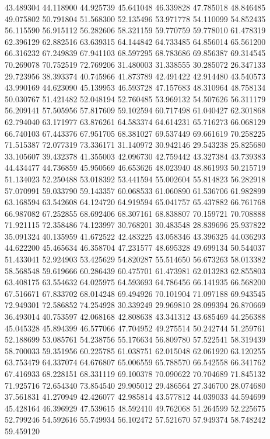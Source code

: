 43.489304
44.118900
44.925739
45.641048
46.339828
47.785018
48.846485
49.075802
50.791804
51.568300
52.135496
53.971778
54.110099
54.852435
56.115590
56.915112
56.282606
58.321159
59.770759
59.778010
61.478319
62.396129
62.882516
63.639315
64.144842
64.733485
64.856014
65.561200
66.316232
67.249839
67.941103
68.597295
68.783686
69.856387
69.314545
70.269078
70.752519
72.769206
31.480003
31.338555
30.285072
26.347133
29.723956
38.393374
40.745966
41.873789
42.491422
42.914480
43.540573
43.990169
44.623090
45.139953
46.593728
47.157683
48.310964
48.758134
50.030767
51.421482
52.048194
52.760485
53.969132
54.507626
56.311179
56.209141
57.505956
57.817609
59.102594
60.717498
61.040427
62.301868
62.794040
63.171977
63.876261
64.583374
64.614231
65.716273
66.068129
66.740103
67.443376
67.951705
68.381027
69.537449
69.661619
70.258225
71.515387
72.077319
73.336171
31.140972
30.942146
29.543238
25.825680
33.105607
39.432378
41.355003
42.096730
42.759442
43.327384
43.739383
44.434477
44.736859
45.950569
46.653626
48.023940
48.861993
50.215719
51.134023
52.250488
53.018392
53.441594
55.002604
55.814823
56.282918
57.070991
59.033790
59.143357
60.068533
61.060890
61.536706
61.982899
63.168594
63.542608
64.124720
64.919594
65.041757
65.437882
66.761768
66.987082
67.252855
68.692406
68.307161
68.838807
70.159721
70.708888
71.921115
72.358486
74.123997
30.768201
30.483548
28.839696
25.937822
35.091324
40.135959
41.672522
42.483225
43.058346
43.396325
44.036293
44.622200
45.465634
46.358704
47.231577
48.695328
49.699134
50.544037
51.433041
52.924903
53.425629
54.820287
55.514650
56.673263
58.013382
58.568548
59.619666
60.286439
60.475701
61.473981
62.013283
62.855803
63.408175
63.554632
64.025975
64.593693
64.786456
66.141935
66.568200
67.516671
67.833702
68.014248
69.494926
70.101904
71.097188
69.943545
72.949301
72.586852
74.254928
30.339249
29.969810
28.099394
26.870669
36.493014
40.753597
42.068168
42.808638
43.341312
43.685469
44.256388
45.045328
45.894399
46.577066
47.704952
49.275514
50.242744
51.259761
52.188699
53.085761
54.238756
55.176634
56.809780
57.522541
58.319439
58.700033
59.351956
60.225785
61.038751
62.015048
62.061920
63.120255
63.753479
64.337074
64.676807
65.006559
65.788570
66.542558
66.341762
67.416933
68.228151
68.331119
69.100378
70.090622
70.704689
71.845132
71.925716
72.654340
73.854540
29.905012
29.486564
27.346700
28.074680
37.561831
41.270949
42.426077
42.985814
43.577812
44.039033
44.594699
45.428164
46.396929
47.539615
48.592410
49.762068
51.264599
52.225675
52.799246
54.592616
55.749934
56.102472
57.521670
57.949374
58.748242
59.459120
